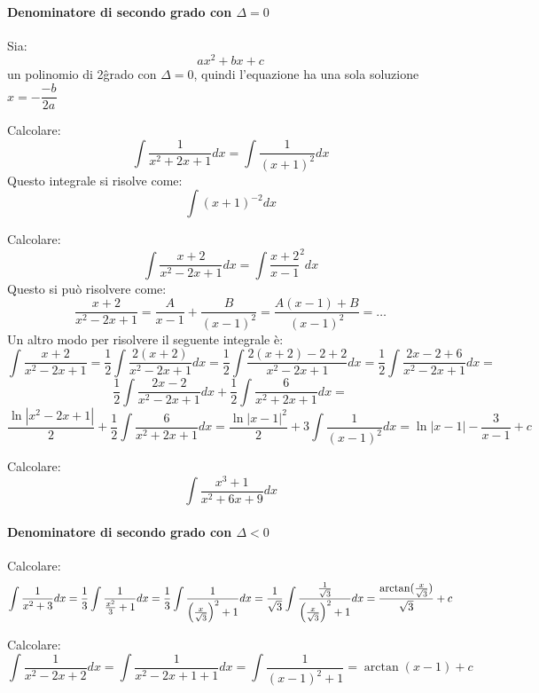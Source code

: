 \documentclass[12pt]{report}
\begin{document}
		\paragraph{Denominatore di secondo grado con $\Delta = 0$}
		Sia:
		\[
		ax^2+bx+c
		\]
		un polinomio di 2\^ grado con $\Delta = 0$, quindi l'equazione ha una sola soluzione $x=-\dfrac{-b}{2a}$ \\
		\begin{example}{}{}
			Calcolare:
			\[
			\int\frac{1}{x^2 + 2x + 1}dx = \int\frac{1}{(x+1)^2}dx
			\]
			Questo integrale si risolve come:
			\[
			\int(x+1)^{-2}dx
			\]
		\end{example}
		\begin{example}{}{}
			Calcolare:
			\[
			\int\frac{x+2}{x^2-2x+1}dx = \int\frac{x+2}{x-1}^2dx
			\]
			Questo si può risolvere come:
			\[
			\frac{x+2}{x^2-2x+1} = \frac{A}{x-1} + \frac{B}{(x-1)^2} = \frac{A(x-1) + B}{(x-1)^2} = \dots
			\]
			Un altro modo per risolvere il seguente integrale è:
			\[
			\int\frac{x+2}{x^2 - 2x + 1} = \frac{1}{2}\int\frac{2(x+2)}{x^2 - 2x + 1}dx = \frac{1}{2}\int\frac{2(x+2)-2+2}{x^2-2x+1}dx = \frac{1}{2}\int\frac{2x-2+6}{x^2 - 2x + 1}dx =
			\]
			\[
			\frac{1}{2}\int\frac{2x - 2}{x^2 -2x + 1}dx + \frac{1}{2}\int\frac{6}{x^2 + 2x + 1}dx =\]
			\[\frac{\ln|x^2 - 2x + 1|}{2} + \frac{1}{2}\int\frac{6}{x^2 + 2x + 1}dx = \frac{\ln|x-1|^2}{2} + 3\int\frac{1}{(x-1)^2}dx = \ln|x-1| - 	\frac{3}{x-1} + c
			\]
		\end{example}
		\begin{example}{}{}
			Calcolare:
			\[
			\int\frac{x^3 + 1}{x^2 + 6x + 9}dx
			\]
		\end{example}
		\paragraph{Denominatore di secondo grado con $\Delta < 0$}
		\begin{example}{}{}
			Calcolare:
			\[
			\int\frac{1}{x^2 + 3}dx = \frac{1}{3}\int\frac{1}{\frac{x^2}{3} + 1}dx = \frac{1}{3}\int\frac{1}{\Bigl(\frac{x}{\sqrt{3}}\Bigr)^2 + 1}dx = \frac{1}{\sqrt{3}}\int\frac{\frac{1}{\sqrt{3}}}{\Bigl(\frac{x}{\sqrt{3}}\Bigr)^2 + 1}dx = \frac{\arctan(\frac{x}{\sqrt{3}})}{\sqrt{3}} + c
			\]
		\end{example}
		\begin{example}{}{}
			Calcolare:
			\[
			\int\frac{1}{x^2-2x+2}dx = \int\frac{1}{x^2 - 2x + 1 + 1}dx = \int\frac{1}{(x-1)^2 + 1} = \arctan(x-1) + c
			\]
		\end{example}
\end{document}
